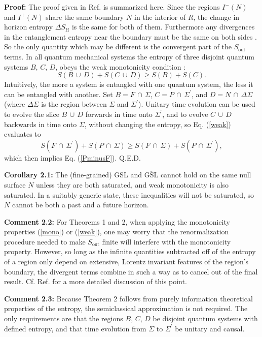 \documentclass{article}
\begin{document}
\textbf{Proof:} The proof given in Ref. \cite{anec} is summarized here.  Since the regions $I^-(N)$ and $I^+(N)$ share the same boundary $N$ in the interior of $R$, the change in horizon entropy $\Delta S_\mathrm{H}$ is the same for both of them.  Furthermore any divergences in the entanglement entropy near the boundary must be the same on both sides \cite{anec}.  So the only quantity which may be different is the convergent part of the $S_\mathrm{out}$ terms.  In all quantum mechanical systems the entropy of three disjoint quantum systems $B$, $C$, $D$, obeys the weak monotonicity condition \cite{weakmono}:
\begin{equation}\label{weak}
S(B\,\cup\,D) + S(C\,\cup\,D) \ge S(B) + S(C).
\end{equation}
Intuitively, the more a system is entangled with one quantum system, the less it can be entangled with another.  Set $B = F\,\cap\,\Sigma$, $C = P\,\cap\,\Sigma^\prime$, and 
$D = N\,\cap\,\Delta \Sigma$ (where $\Delta \Sigma$ is the region between $\Sigma$ and $\Sigma^\prime$).  Unitary time evolution can be used to evolve the slice $B\,\cup\,D$ forwards in time onto $\Sigma^\prime$, and to evolve $C\,\cup\,D$ backwards in time onto $\Sigma$, without changing the entropy, so Eq. (\ref{weak}) evaluates to
\begin{equation}
S(F\,\cap\,\Sigma^\prime) + S(P\,\cap\,\Sigma) \ge S(F\,\cap\,\Sigma) + S(P\,\cap\,\Sigma^\prime),
\end{equation}
which then implies Eq. (\ref{PminusF}). Q.E.D.

\textbf{Corollary 2.1:} The (fine-grained) GSL and $\overline{\mathrm{GSL}}$ cannot hold on the same null surface $N$ unless they are both saturated, and weak monotonicity is also saturated.  In a suitably generic state, these inequalities will not be saturated, so $N$ cannot be both a past and a future horizon.

\textbf{Comment 2.2:} For Theorems 1 and 2, when applying the monotonicity properties (\ref{mono}) or (\ref{weak}), one may worry that the renormalization procedure needed to make $S_\mathrm{out}$ finite will interfere with the monotonicity property.  However, so long as the  infinite quantities subtracted off of the entropy of a region only depend on extensive, Lorentz invariant features of the region's boundary, the divergent terms combine in such a way as to cancel out of the final result.  Cf. Ref. \cite{anec} for a more detailed discussion of this point.

\textbf{Comment 2.3:} Because Theorem 2 follows from purely information theoretical properties of the entropy, the semiclassical approximation is not required.  The only requirements are that the regions $B$, $C$, $D$ be disjoint quantum systems with defined entropy, and that time evolution from $\Sigma$ to $\Sigma^\prime$ be unitary and causal.
\end{document}
